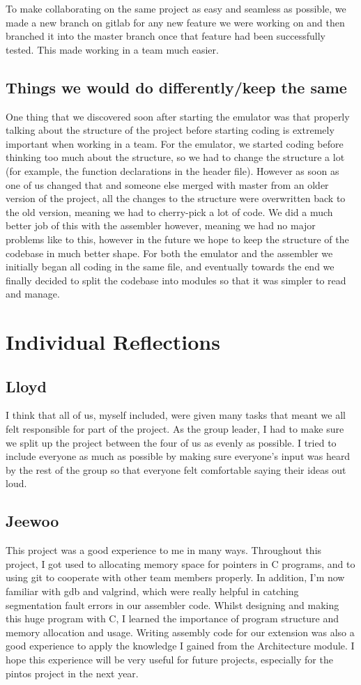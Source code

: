 \documentclass[a4paper]{article}
\begin{document}
To make collaborating on the same project as easy and seamless as possible, we made a new branch on gitlab for any new feature we were working on and then branched it into the master branch once that feature had been successfully tested. This made working in a team much easier.

\subsection{Things we would do differently/keep the same}
One thing that we discovered soon after starting the emulator was that properly talking about the structure of the project before starting coding is extremely important when working in a team. For the emulator, we started coding before thinking too much about the structure, so we had to change the structure a lot (for example, the function declarations in the header file). However as soon as one of us changed that and someone else merged with master from an older version of the project, all the changes to the structure were overwritten back to the old version, meaning we had to cherry-pick a lot of code. We did a much better job of this with the assembler however, meaning we had no major problems like to this, however in the future we hope to keep the structure of the codebase in much better shape. For both the emulator and the assembler we initially began all coding in the same file, and eventually towards the end we finally decided to split the codebase into modules so that it was simpler to read and manage. 

\section{Individual Reflections}
\subsection{Lloyd}
I think that all of us, myself included, were given many tasks that meant we all felt responsible for part of the project. As the group leader, I had to make sure we split up the project between the four of us as evenly as possible. I tried to include everyone as much as possible by making sure everyone’s input was heard by the rest of the group so that everyone felt comfortable saying their ideas out loud.
\subsection{Jeewoo}
This project was a good experience to me in many ways. Throughout this project, I got used to allocating memory space for pointers in C programs, and to using git to cooperate with other team members properly. In addition, I’m now familiar with gdb and valgrind, which were really helpful in catching segmentation fault errors in our assembler code. Whilst designing and making this huge program with C, I learned the importance of program structure and memory allocation and usage. Writing assembly code for our extension was also a good experience to apply the knowledge I gained from the Architecture module. I hope this experience will be very useful for future projects, especially for the pintos project in the next year.
\end{document}
